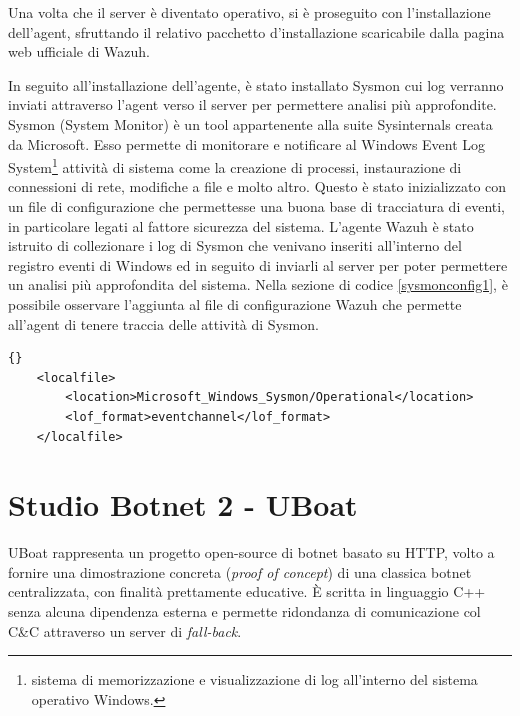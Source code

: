 Una volta che il server è diventato operativo, si è proseguito con l'installazione dell'agent, sfruttando il relativo pacchetto d'installazione scaricabile dalla pagina web ufficiale di Wazuh.
\medskip

In seguito all'installazione dell'agente, è stato installato Sysmon cui log verranno inviati attraverso l'agent verso il server per permettere analisi più approfondite. Sysmon \cite{sysmon} (System Monitor) è un tool appartenente alla suite Sysinternals creata da Microsoft. Esso permette di monitorare e notificare al Windows Event Log System\footnote{sistema di memorizzazione e visualizzazione di log all'interno del sistema operativo Windows.} attività di sistema come la creazione di processi, instaurazione di connessioni di rete, modifiche a file e molto altro. Questo è stato inizializzato con un file di configurazione \cite{sysmonconfig} che permettesse una buona base di tracciatura di eventi, in particolare legati al fattore sicurezza del sistema.
L'agente  Wazuh è stato istruito di collezionare i log di Sysmon che venivano inseriti all'interno del registro eventi di Windows ed in seguito di inviarli al server per poter permettere un analisi più approfondita del sistema.
Nella sezione di codice \ref{sysmonconfig1}, è possibile osservare l'aggiunta al file di configurazione Wazuh che permette all'agent di tenere traccia delle attività di Sysmon.
\begin{lstlisting}[floatplacement=H,caption={Aggiunta al file di configurazione dell'agent.},captionpos=b,label={sysmonconfig1}]{}
    <localfile>
        <location>Microsoft_Windows_Sysmon/Operational</location>
        <lof_format>eventchannel</lof_format>
    </localfile>
\end{lstlisting}



\chapter{Studio Botnet 2 - UBoat}
\label{uboat}




UBoat \cite{uboat} rappresenta un progetto open-source di botnet basato su HTTP, volto a fornire una dimostrazione concreta (\textit{proof of concept}) di una classica botnet centralizzata, con finalità prettamente educative. È scritta in linguaggio C++ senza alcuna dipendenza esterna e permette ridondanza di comunicazione col C\&C attraverso un server di \textit{fall-back}.

